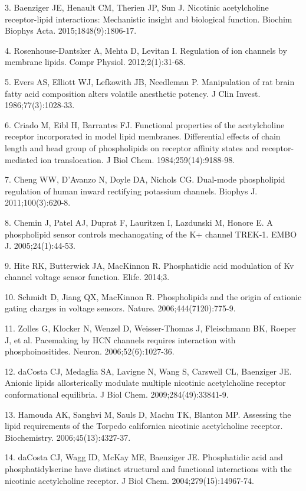 3. Baenziger JE, Henault CM, Therien JP, Sun J. Nicotinic acetylcholine
receptor-lipid interactions: Mechanistic insight and biological
function. Biochim Biophys Acta. 2015;1848(9):1806-17.

4. Rosenhouse-Dantsker A, Mehta D, Levitan I. Regulation of ion channels
by membrane lipids. Compr Physiol. 2012;2(1):31-68.

5. Evers AS, Elliott WJ, Lefkowith JB, Needleman P. Manipulation of rat
brain fatty acid composition alters volatile anesthetic potency. J Clin
Invest. 1986;77(3):1028-33.

6. Criado M, Eibl H, Barrantes FJ. Functional properties of the
acetylcholine receptor incorporated in model lipid membranes.
Differential effects of chain length and head group of phospholipids on
receptor affinity states and receptor-mediated ion translocation. J Biol
Chem. 1984;259(14):9188-98.

7. Cheng WW, D'Avanzo N, Doyle DA, Nichols CG. Dual-mode phospholipid
regulation of human inward rectifying potassium channels. Biophys J.
2011;100(3):620-8.

8. Chemin J, Patel AJ, Duprat F, Lauritzen I, Lazdunski M, Honore E. A
phospholipid sensor controls mechanogating of the K+ channel TREK-1.
EMBO J. 2005;24(1):44-53.

9. Hite RK, Butterwick JA, MacKinnon R. Phosphatidic acid modulation of
Kv channel voltage sensor function. Elife. 2014;3.

10. Schmidt D, Jiang QX, MacKinnon R. Phospholipids and the origin of
cationic gating charges in voltage sensors. Nature.
2006;444(7120):775-9.

11. Zolles G, Klocker N, Wenzel D, Weisser-Thomas J, Fleischmann BK,
Roeper J, et al. Pacemaking by HCN channels requires interaction with
phosphoinositides. Neuron. 2006;52(6):1027-36.

12. daCosta CJ, Medaglia SA, Lavigne N, Wang S, Carswell CL, Baenziger
JE. Anionic lipids allosterically modulate multiple nicotinic
acetylcholine receptor conformational equilibria. J Biol Chem.
2009;284(49):33841-9.

13. Hamouda AK, Sanghvi M, Sauls D, Machu TK, Blanton MP. Assessing the
lipid requirements of the Torpedo californica nicotinic acetylcholine
receptor. Biochemistry. 2006;45(13):4327-37.

14. daCosta CJ, Wagg ID, McKay ME, Baenziger JE. Phosphatidic acid and
phosphatidylserine have distinct structural and functional interactions
with the nicotinic acetylcholine receptor. J Biol Chem.
2004;279(15):14967-74.

